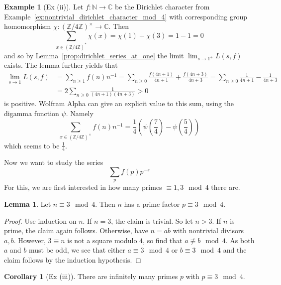 \documentclass{scrartcl}
\newcommand{\N}{\mathbb{N}}
\newcommand{\Z}{\mathbb{Z}}
\newcommand{\C}{\mathbb{C}}
\newcommand{\units}{\times}
\theoremstyle{definition}
\newtheorem{lemma}[definition]{Lemma}
\newtheorem{example}[definition]{Example}
\newtheorem{corollary}[definition]{Corollary}
\begin{document}
\begin{example}[Ex (ii)]
    Let $f: \N \to \C$ be the Dirichlet character from Example~\ref{ex:nontrivial_dirichlet_character_mod_4} with corresponding group homomorphism $\chi: (\Z/4\Z)^\units \to \C$.
    Then
    \begin{equation*}
        \sum_{x \in (\Z/4\Z)^*} \chi(x) = \chi(1) + \chi(3) = 1 - 1 = 0
    \end{equation*}
    and so by Lemma~\ref{prop:dirichlet_series_at_one} the limit $\lim_{s \to 1^+} L(s, f)$ exists.
    The lemma further yields that
    \begin{align*}
        \lim_{s \to 1} L(s, f) &= \sum_{n \geq 1} f(n) n^{-1} = \sum_{n \geq 0} \frac {f(4n + 1)} {4n + 1} + \frac {f(4n + 3)} {4n + 3} = \sum_{n \geq 0} \frac 1 {4n + 1} - \frac 1 {4n + 3} \\
        &= 2 \sum_{n \geq 0} \frac 1 {(4n + 1)(4n + 3)} > 0
    \end{align*}
    is positive. 
    Wolfram Alpha \cite{wolfram_alpha} can give an explicit value to this sum, using the digamma function $\psi$. Namely
    \begin{equation*}
        \sum_{x \in (\Z/4\Z)^\units} f(n) n^{-1} = \frac 1 4 (\psi(\frac 7 4) - \psi(\frac 5 4))
    \end{equation*}
    which seems to be $\frac 1 4$.
\end{example}
Now we want to study the series
\begin{equation*}
    \sum_p f(p) p^{-s}
\end{equation*}
For this, we are first interested in how many primes $\equiv 1, 3 \mod 4$ there are.
\begin{lemma}
    \label{prop:prime_factor_3_mod_4}
    Let $n \equiv 3 \mod 4$. Then $n$ has a prime factor $p \equiv 3 \mod 4$.
\end{lemma}
\begin{proof}
    Use induction on $n$.
    If $n = 3$, the claim is trivial. 
    So let $n > 3$. If $n$ is prime, the claim again follows.
    Otherwise, have $n = ab$ with nontrivial divisors $a, b$.
    However, $3 \equiv n$ is not a square modulo $4$, so find that $a \not\equiv b \mod 4$.
    As both $a$ and $b$ must be odd, we see that either $a \equiv 3 \mod 4$ or $b \equiv 3 \mod 4$ and the claim follows by the induction hypothesis.
\end{proof}
\begin{corollary}[Ex (iii)]
    There are infinitely many primes $p$ with $p \equiv 3 \mod 4$.
\end{corollary}
\end{document}
